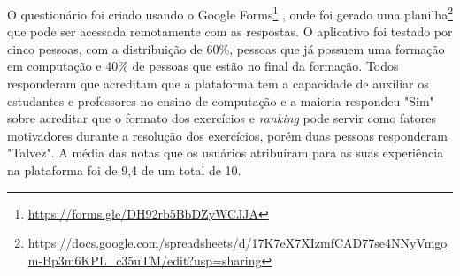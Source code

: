 O questionário foi criado usando o Google Forms\footnote{\url{https://forms.gle/DH92rb5BbDZyWCJJA}} \cite{forms}, onde foi gerado uma planilha\footnote{\url{https://docs.google.com/spreadsheets/d/17K7eX7XIzmfCAD77se4NNyVmgom-Bp3m6KPL_c35uTM/edit?usp=sharing}} que pode ser acessada remotamente com as respostas.
O aplicativo foi testado por cinco pessoas, com a distribuição de 60\%, pessoas que já possuem uma formação em computação e 40\% de pessoas que estão no final da formação. Todos responderam que acreditam que a plataforma tem a capacidade de auxiliar os estudantes e professores no ensino de computação e a maioria respondeu "Sim" sobre acreditar que o formato dos exercícios e \textit{ranking} pode servir como fatores motivadores durante a resolução dos exercícios, porém duas pessoas responderam "Talvez". A média das notas que os usuários atribuíram para as suas experiência na plataforma foi de 9,4 de um total de 10.
